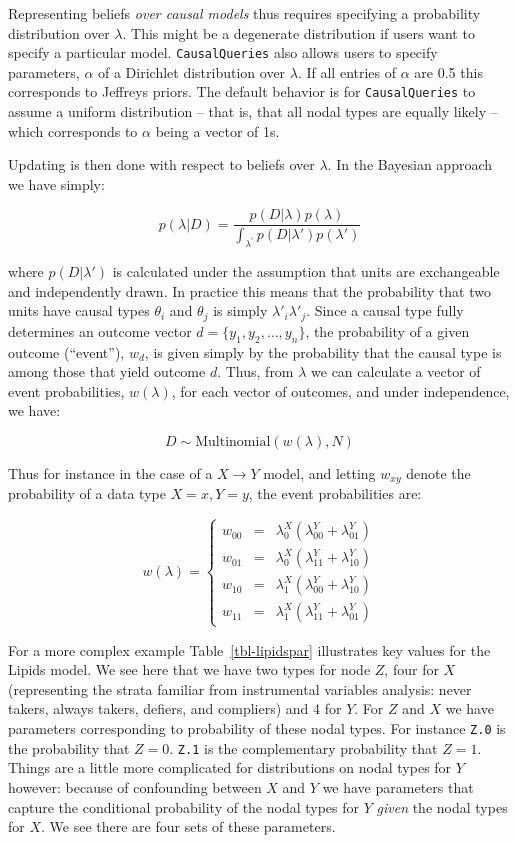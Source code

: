\documentclass[
  11pt,
  article]{jss}
\begin{document}
Representing beliefs \emph{over causal models} thus requires specifying
a probability distribution over \(\lambda\). This might be a degenerate
distribution if users want to specify a particular model.
\texttt{CausalQueries} also allows users to specify parameters,
\(\alpha\) of a Dirichlet distribution over \(\lambda\). If all entries
of \(\alpha\) are 0.5 this corresponds to Jeffreys priors. The default
behavior is for \texttt{CausalQueries} to assume a uniform distribution
-- that is, that all nodal types are equally likely -- which corresponds
to \(\alpha\) being a vector of 1s.

Updating is then done with respect to beliefs over \(\lambda\). In the
Bayesian approach we have simply:

\[p(\lambda|D) = \frac{p(D|\lambda)p(\lambda)}{\int_{\lambda^{'}} p(D|\lambda')p(\lambda')}\]

where \(p(D|\lambda')\) is calculated under the assumption that units
are exchangeable and independently drawn. In practice this means that
the probability that two units have causal types \(\theta_i\) and
\(\theta_j\) is simply \(\lambda'_i\lambda'_j\). Since a causal type
fully determines an outcome vector \(d = \{y_1, y_2,\dots,y_n\}\), the
probability of a given outcome (``event''), \(w_d\), is given simply by
the probability that the causal type is among those that yield outcome
\(d\). Thus, from \(\lambda\) we can calculate a vector of event
probabilities, \(w(\lambda)\), for each vector of outcomes, and under
independence, we have:

\[D \sim \text{Multinomial}(w(\lambda), N)\]

Thus for instance in the case of a \(X \rightarrow Y\) model, and
letting \(w_{xy}\) denote the probability of a data type \(X=x, Y=y\),
the event probabilities are:

\[w(\lambda) = \left\{\begin{array}{ccc} w_{00} & = & \lambda^X_0(\lambda^Y_{00} + \lambda^Y_{01})\\ 
w_{01} & = & \lambda^X_0(\lambda^Y_{11} + \lambda^Y_{10})\\
w_{10} & = & \lambda^X_1(\lambda^Y_{00} + \lambda^Y_{10})\\
w_{11} & = & \lambda^X_1(\lambda^Y_{11} + \lambda^Y_{01})\end{array} \right.\]

For a more complex example Table~\ref{tbl-lipidspar} illustrates key
values for the Lipids model. We see here that we have two types for node
\(Z\), four for \(X\) (representing the strata familiar from
instrumental variables analysis: never takers, always takers, defiers,
and compliers) and 4 for \(Y\). For \(Z\) and \(X\) we have parameters
corresponding to probability of these nodal types. For instance
\texttt{Z.0} is the probability that \(Z=0\). \texttt{Z.1} is the
complementary probability that \(Z=1\). Things are a little more
complicated for distributions on nodal types for \(Y\) however: because
of confounding between \(X\) and \(Y\) we have parameters that capture
the conditional probability of the nodal types for \(Y\) \emph{given}
the nodal types for \(X\). We see there are four sets of these
parameters.
\end{document}
